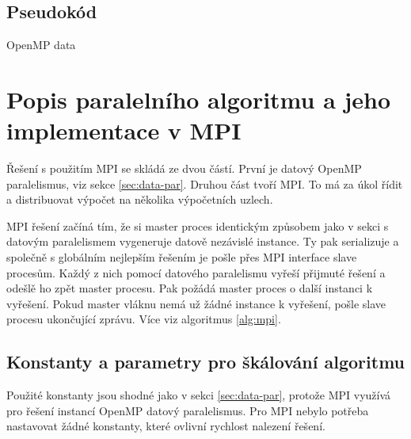 \documentclass{article}
\begin{document}
    \subsection{Pseudokód}

    \begin{algorithm}[H]
        \SetAlgoLined
        \DontPrintSemicolon

        \;
        \caption{OpenMP data}
        \label{alg:openmp-data}
    \end{algorithm}


    \pagebreak
    \label{sec:mpi}
    \section{Popis paralelního algoritmu a jeho implementace v MPI}

    Řešení s použitím MPI se skládá ze dvou částí. První je datový OpenMP paralelismus,
    viz sekce \ref{sec:data-par}. Druhou část tvoří MPI. To má za úkol řídit a distribuovat
    výpočet na několika výpočetních uzlech.

    MPI řešení začíná tím, že si master proces identickým způsobem jako v sekci s datovým paralelismem
    vygeneruje datově nezávislé instance. Ty pak serializuje a společně s globálním nejlepším řešením je
    pošle přes MPI interface slave procesům. Každý z nich pomocí datového paralelismu vyřeší přijmuté řešení a
    odešlě ho zpět master procesu. Pak požádá master proces o další instanci k vyřešení.
    Pokud master vláknu nemá už žádné instance k vyřešení, pošle slave procesu ukončující zprávu.
    Více viz algoritmus \ref{alg:mpi}.

    \subsection{Konstanty a parametry pro škálování algoritmu}
    Použité konstanty jsou shodné jako v sekci \ref{sec:data-par}, protože MPI využívá pro řešení instancí
    OpenMP datový paralelismus. Pro MPI nebylo potřeba nastavovat žádné konstanty, které ovlivní rychlost
    nalezení řešení.
\end{document}
